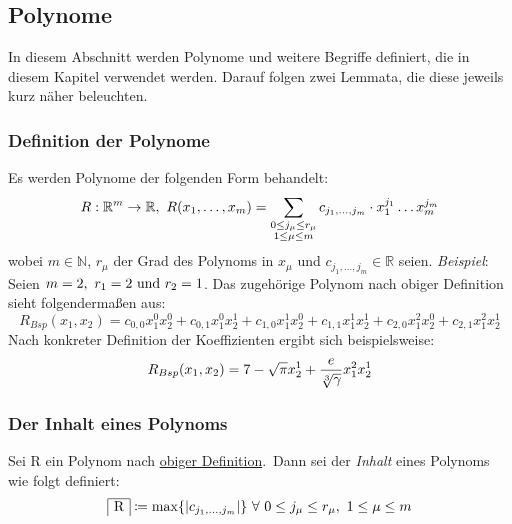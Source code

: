 
\subsection{Polynome}
    \label{subsec:polynomials}
    \textrm{In diesem Abschnitt werden Polynome und weitere Begriffe definiert, die in diesem Kapitel verwendet werden.
    Darauf folgen zwei Lemmata, die diese jeweils kurz näher beleuchten.}
    
    \subsubsection{Definition der Polynome}
        \label{subsubsec:def-poly}
        Es werden Polynome der folgenden Form behandelt:
        \begin{equation}
            R : \mathbb{R}^m \rightarrow \mathbb{R},\
            R(x_1, \dots, x_m) = \sum_{\substack{0 \leq j_\mu \leq r_\mu \\ 1 \leq \mu \leq m}}
            c_{j_1, \dots, j_m} \cdot x_1^{j_1} \dots x_m^{j_m} \label{eq:def-poly}
        \end{equation}
        wobei $m \in \mathbb{N}$, $r_\mu$ der Grad des Polynoms in $x_\mu$ und $c_{j_1, \dots, j_m} \in \mathbb{R}$ seien.
        \newpage
        \emph{Beispiel}: Seien $m = 2,\ r_1 = 2 \ \textrm{und}\  r_2 = 1$.
        \newline
        \textrm{Das zugehörige Polynom nach obiger Definition sieht folgendermaßen aus:}
        \begin{equation*}
            R_{Bsp}(x_1, x_2) = c_{0,0} x_1^0 x_2^0 + c_{0,1} x_1^0 x_2^1 + c_{1,0} x_1^1 x_2^0 + c_{1,1} x_1^1
            x_2^1 + c_{2, 0} x_1^2 x_2^0 + c_{2,1} x_1^2 x_2^1
        \end{equation*}
        Nach konkreter Definition der Koeffizienten ergibt sich beispielsweise:
        \begin{equation*}
            R_{Bsp}(x_1, x_2) = 7 - \sqrt{\pi} x_2^1 + \frac{e}{\sqrt[3]{\gamma}} x_1^2 x_2^1
        \end{equation*}
    
    \subsubsection{Der Inhalt eines Polynoms}
        \label{subsubsec:def-content}
        Sei R ein Polynom nach \hyperref[subsubsec:def-poly]{obiger Definition}.\ Dann sei der \emph{Inhalt} eines
        Polynoms wie folgt definiert:
        \begin{equation}
            \content{R} \coloneq \max\{|c_{\enum{j_1}{j_m}}| \} \  \forall \  0 \leq j_\mu \leq r_\mu, \
            1 \leq \mu \leq m \label{eq:def-content}
        \end{equation}
    
